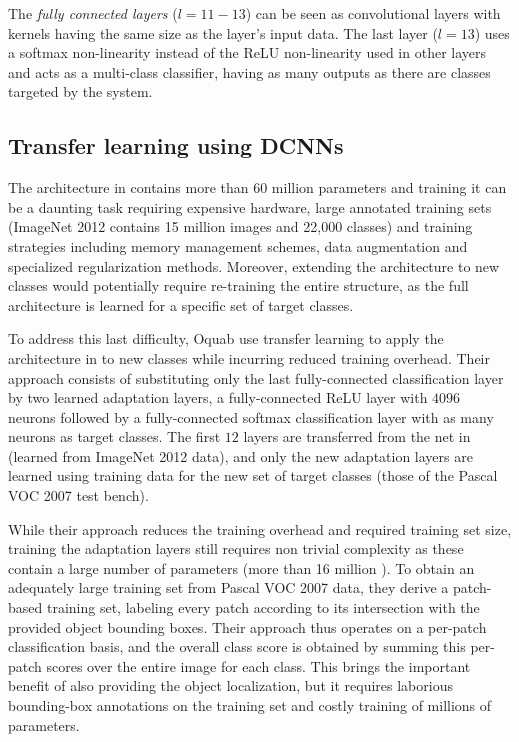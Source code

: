 \documentclass{article}
\begin{document}
The \emph{fully connected layers} ($l=11-13$) can be seen as convolutional layers with kernels having the same size as the layer's input data. The last layer ($l=13$) uses a softmax non-linearity instead of the ReLU non-linearity used in other layers and acts as a multi-class classifier, having as many outputs as there are classes targeted by the system.


\subsection{Transfer learning using DCNNs} The architecture in  contains more than 60 million parameters and training it can be a daunting task requiring expensive hardware, large annotated training sets (ImageNet 2012 contains 15 million images and 22,000 classes) and training strategies including memory management schemes, data augmentation and specialized regularization methods. Moreover, extending the architecture to new classes would potentially require re-training the entire structure, as the full architecture is learned for a specific set of target classes.

To address this last difficulty, Oquab \etal \cite{Oquaba} use transfer learning to apply the architecture in  to new classes while incurring reduced training overhead. Their approach consists of substituting only the last fully-connected classification layer by two learned adaptation layers, a fully-connected ReLU layer with $4096$ neurons followed by a fully-connected softmax classification layer with as many neurons as target classes. The first $12$ layers are transferred from the net in  (learned from ImageNet 2012 data), and only the new adaptation layers are learned using training data for the new set of target classes  (\eg those of the Pascal VOC 2007 test bench). 

While their approach reduces the training overhead and required training set size, training the adaptation layers still requires non trivial complexity as these contain a large number of parameters (more than 16 million ). To obtain an adequately large training set from Pascal VOC 2007 data, they derive a patch-based training set, labeling every patch according to its intersection with the provided object bounding boxes. Their approach thus operates on a per-patch classification basis, and the overall class score is obtained by summing this per-patch scores over the entire image for each class. This brings the important benefit of also providing the object localization, but it requires laborious bounding-box annotations on the training set and costly training of millions of parameters.
\end{document}
